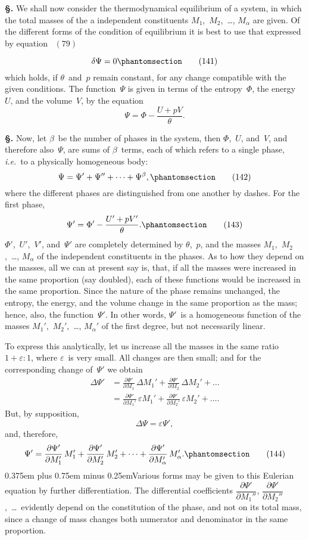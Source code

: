 \documentclass[12pt]{book}[2005/09/16]
\newcommand{\Chg}[2]{#2}
\newcommand{\Add}[1]{\Chg{}{#1}}
\newcommand{\Erratum}[2]{#2}
\newcommand{\Loosen}{\spaceskip 0.375em plus 0.75em minus 0.25em}
\newcommand{\Section}[1]{
  \medskip\par\textbf{§\;#1}
  \label{section:#1}
}
\newcommand{\Tag}[1]{%
  \phantomsection\label{eqn:#1}\tag*{\ensuremath{#1}}%
}
\newcommand{\Eq}[1]{%
  \hyperref[eqn:#1]{\ensuremath{#1}}%
}
\newcommand{\PageSep}[1]{\ignorespaces}
\newcommand{\ie}{\emph{i.e.}}
\newcommand{\dd}{\partial}
\newcommand{\eps}{\varepsilon}
\begin{document}
\Section{200.} We shall now consider the thermodynamical
equilibrium of a system, in which the total masses of the
a independent constituents $M_{1}$,~$M_{2}$,~\dots\Add{,} $M_{\alpha}$ are given. Of
the different forms of the condition of equilibrium it is best
to use that expressed by equation~\Eq{(79)}
\[
\delta \Psi = 0
\Tag{(141)}
\]
which holds, if $\theta$~and~$p$ remain constant, for any change
compatible with the given conditions. The function~$\Psi$ is
given in terms of the entropy~$\Phi$, the energy~$U$, and the
volume~$V$, by the equation
\[
\Psi = \Phi - \frac{U + pV}{\theta}.
\]

\Section{201.} Now, let $\beta$~be the number of phases in the system,
then $\Phi$,~$U$, and~$V$, and therefore also~$\Psi$, are sums of $\beta$~terms,
each of which refers to a single phase, \ie\ to a
physically homogeneous body:
\[
\Psi = \Psi' + \Psi'' + \dots +\Psi^{\beta}\Add{,}
\Tag{(142)}
\]
where the different phases are distinguished from one another
by dashes. For the first phase,
\[
\Psi' = \Phi' - \frac{U' + pV'}{\theta}.
\Tag{(143)}
\]
$\Phi'$,~$U'$,~$V'$\Add{,} and~$\Psi'$ are completely determined by $\theta$,~$p$, and
the masses $M_{1}$,~$M_{2}$,~\dots\Add{,} $M_{\alpha}$ of the independent constituents
in the phases. As to how they depend on the masses, all
we can at present say is, that, if all the masses were increased
in the same proportion (say doubled), each of these functions
would be increased in the same proportion. Since the
nature of the phase remains unchanged, the entropy, the
energy, and the volume change in the same proportion as
\PageSep{176}
the mass; hence, also, the function~$\Psi'$. In other words, $\Psi'$~is
a homogeneous function of the masses $M_{1}'$,~$M_{2}'$,~\dots\Add{,} $M_{\alpha}'$
of the first degree, but not necessarily linear.

To express this analytically, let us increase all the masses
in the same ratio $1 + \eps: 1$, where $\eps$~is very small. All
changes are then small; and for the corresponding change
of~$\Psi'$ we obtain
\begin{align*}
\Delta \Psi'
  &= \frac{\dd \Psi'}{\dd M_{1}}\, \Erratum{\Delta M_{1}}{\Delta M_{1}'} + \frac{\dd \Psi'}{\dd M_{2}}\, \Delta M_{2}' + \dots \\
  &= \frac{\dd \Psi'}{\dd M_{1}'}\, \eps M_{1}' + \frac{\dd \Psi'}{\dd M_{2}'}\, \eps M_{2}' + \dots\Add{.}
\end{align*}
But, by supposition,
\[
\Delta \Psi = \eps\Psi',
\]
and, therefore,
%
\[
\Psi' = \frac{\dd \Psi'}{\dd M_{1}'}\, M_{1}' + \frac{\dd \Psi'}{\dd M_{2}'}\, M_{2}' + \dots + \frac{\dd \Psi'}{\dd M_{\alpha}'}\, M_{\alpha}'.
\Tag{(144)}
\]
{\Loosen Various forms may be given to this Eulerian equation
by further differentiation. The differential coefficients $\dfrac{\dd \Psi'}{\dd M_{1}''}$,
$\dfrac{\dd \Psi'}{\dd M_{2}''}$\Add{,}~\dots\ evidently depend on the constitution of the phase,
and not on its total mass, since a change of mass changes
both numerator and denominator in the same proportion.}
\end{document}
